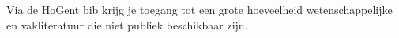 Via de HoGent bib krijg je toegang tot een grote hoeveelheid wetenschappelijke en vakliteratuur die niet publiek beschikbaar zijn.
%
%
%
%

%
